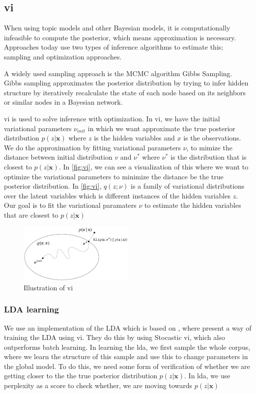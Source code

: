 \subsection{\gls{vi}}
When using topic models and other Bayesian models, it is computationally infeasible to compute the posterior, which means approximation is necessary. 
Approaches today use two types of inference algorithms to estimate this; sampling and optimization approaches.

A widely used sampling approach is the MCMC algorithm Gibbs Sampling.
Gibbs sampling approximates the posterior distribution by trying to infer hidden structure by iteratively recalculate the state of each node based on its neighbors or similar nodes in a Bayesian network.

\gls{vi} is used to solve inference with optimization.
In \gls{vi}, we have the initial variational parameters $\nu_{init}$ in which we want approximate the true posterior distribution $p(z|\textbf{x})$ where $z$ is the hidden variables and $x$ is the observations.
We do the approximation by fitting variational parameters $\nu$, to mimize the distance between initial distribution $v$ and $\nu^*$ where $\nu^*$ is the distribution that is closest to $p(z|\textbf{x})$.
In \autoref{fig:vi}, we can see a visualization of this where we want to optimize the variational parameters to minimize the distance be the true posterior distribution.
In \autoref{fig:vi}, $q(z; \nu)$ is a family of variational distributions over the latent variables which is different instances of the hidden variables $z$.
Our goal is to fit the variational paramaters $\nu$ to estimate the hidden variables that are closest to $p(z|\textbf{x})$

\begin{figure}
	\centering
	\includegraphics[width=0.5\textwidth]{figures/vi_illustration.png}
	\caption[Caption for LOF]{Illustration of \acrlong{vi}\footnotemark}
	\label{fig:vi}
\end{figure}

\subsubsection*{LDA learning}
We use an implementation of the LDA which is based on \cite{blei2010online}, where \citeauthor{blei2010online} present a way of training the LDA using \gls{vi}.
They do this by using Stocastic \gls{vi}, which also outperforms batch learning.
In learning the \gls{lda}, we first sample the whole corpus, where we learn the structure of this sample and use this to change parameters in the global model.
To do this, we need some form of verification of whether we are getting closer to the the true posterior distribution $p(z|\textbf{x})$.
In \gls{lda}, we use perplexity as a score to check whether, we are moving towards $p(z|\textbf{x})$
